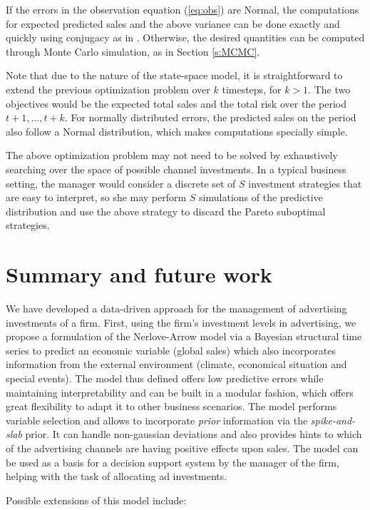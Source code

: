 If the errors in the observation equation (\ref{eq:obs}) are Normal, the computations for expected predicted sales and the above variance can be done exactly and quickly using conjugacy as in \cite[3.7.1]{zbMATH06123712}.
Otherwise, the desired quantities can be computed through Monte Carlo simulation, as in Section \ref{s:MCMC}.

Note that due to the nature of the state-space model, it is straightforward to extend the previous optimization problem over $k$ timesteps, for $k>1$.
The two objectives would be the expected total sales and the total risk over the period $t+1,\dots,t+k$.
For normally distributed errors, the predicted sales on the period also follow a Normal distribution, which makes computations specially simple.

The above optimization problem may not need to be solved by exhaustively searching over the space of possible channel investments. In a typical business setting, the manager would consider a discrete set of $S$ investment strategies that are easy to interpret, so she may perform $S$ simulations of the predictive distribution and use the above strategy to discard the Pareto suboptimal strategies.

\section{Summary and future work}

We have developed a data-driven approach for the management of advertising investments of a firm. First, using the firm's investment levels in advertising, we propose a formulation of the Nerlove-Arrow model via a Bayesian structural time series to predict an economic variable (global sales)  which also incorporates information from the external environment (climate, economical situation and special events). The model thus defined offers low predictive errors while maintaining interpretability and can be built in a modular fashion, which offers great flexibility to adapt it to other business scenarios. The model performs variable selection and allows to incorporate \emph{prior} information via the \emph{spike-and-slab} prior. It can handle non-gaussian deviations and also provides hints to which of the advertising channels are having positive effects upon sales. The model can be used as a basis for a decision support system by the manager of the firm, helping with the task of allocating ad investments.

Possible extensions of this model include:

